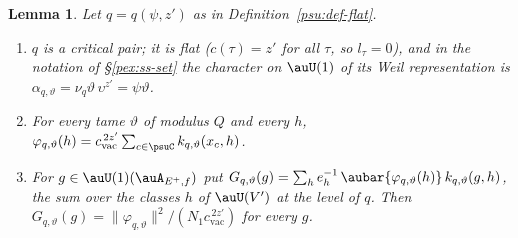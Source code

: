 \documentclass[10pt]{amsart}
\newtheorem{lemma}[theorem]{Lemma}
\theoremstyle{definition}
\theoremstyle{remark}
\begin{document}
\begin{lemma}\label{psu:flat}
Let $q=q(\psi,z')$ as in Definition~\ref{psu:def-flat}.
\begin{enumerate}
\item[(a)] $q$ is a critical pair; it is flat ($c(\tau)=z'$ for all $\tau$, so $l_\tau=0$), and in the
notation of \S\ref{pex:ss-set} the character on $\auU(1)$ of its Weil representation is
$\alpha_{q,\vartheta}=\nu_q\vartheta\,\upsilon^{z'}=\psi\vartheta$.
\item[(b)] For every tame $\vartheta$ of modulus $Q$ and every $h$,
$\varphi_{q,\vartheta}(h)=c_{\mathrm{vac}}^{\,2z'}\sum_{c\in\psuC}k_{q,\vartheta}(x_c,h)$.
\item[(c)] For $g\in\auU(1)(\auA_{E^+,f})$ put $G_{q,\vartheta}(g)=\sum_he_h^{-1}\,\aubar{\varphi_{q,
\vartheta}(h)}\,k_{q,\vartheta}(g,h)$, the sum over the classes $h$ of $\auU(V')$ at the level of
$q$. Then $G_{q,\vartheta}(g)=\|\varphi_{q,\vartheta}\|^2/(N_1c_{\mathrm{vac}}^{\,2z'})$ for every $g$.
\end{enumerate}
\end{lemma}
\end{document}
